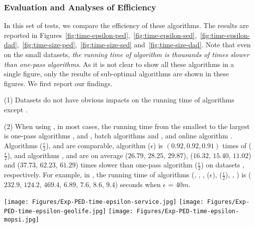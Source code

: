 {%
\subsubsection{Evaluation and Analyses of Efficiency}

In this set of tests, we compare the efficiency of these algorithms.
The results are reported in Figures~\ref{fig:time-epsilon-ped},~\ref{fig:time-epsilon-sed},~\ref{fig:time-epsilon-dad},~\ref{fig:time-size-ped},~\ref{fig:time-size-sed} and~\ref{fig:time-size-dad}.
Note that even on the small datasets, \emph{the running time of algorithm \opt  is thousands of times slower than one-pass algorithms}. As it is not clear to show all these algorithms in a single figure, only the results of sub-optimal algorithms are shown in these figures.
We first report our findings.



\sstab (1) {Datasets do not have obvious impacts on the running time of \lsa algorithms except \dagots. }

	
\sstab (2) When using \ped, in most cases, the running time from the smallest to the largest is one-pass algorithms \siped, \operb and , batch algorithms \tpa and \dpa, and online algorithm \bqsa.
Algorithms \siped($\frac{\epsilon}{2}$), {\operb} and  are comparable, algorithm \siped(${\epsilon}$) is $(0.92, 0.92, 0.91)$ times of \siped($\frac{\epsilon}{2}$), and algorithms \tpa, \dpa and \bqsa are on average
($26.79$, $28.25$, $29.87$), ($16.32$, $15.40$, $11.02$) and ($37.73$, $62.23$, $61.29$)
times slower than one-pass algorithm \siped($\frac{\epsilon}{2}$) on datasets \dSets, respectively.
For example, in \mopsi, the running time of algorithms
(\tpa, \dpa, \bqsa, \siped(${\epsilon}$), \siped($\frac{\epsilon}{2}$), \operb,  ) is ($232.9$, $124.2$, $469.4$, $6.89$, $7.6$, $8.6$, {$9.4$}) seconds when $\epsilon$ = $40m$.



\begin{figure*}[tb!]
	\centering
	\texttt{[image: Figures/Exp-PED-time-epsilon-service.jpg]}	\hspace{0.5ex}
	\texttt{[image: Figures/Exp-PED-time-epsilon-geolife.jpg]}	\hspace{0.5ex}
	\texttt{[image: Figures/Exp-PED-time-epsilon-mopsi.jpg]}	
	\vspace{-2ex}
	\caption{\small Evaluation of running time (\ped) on full datasets: varying the error bound $\epsilon$.}\label{fig:time-epsilon-ped}
	\vspace{-2ex}
\end{figure*}

}
